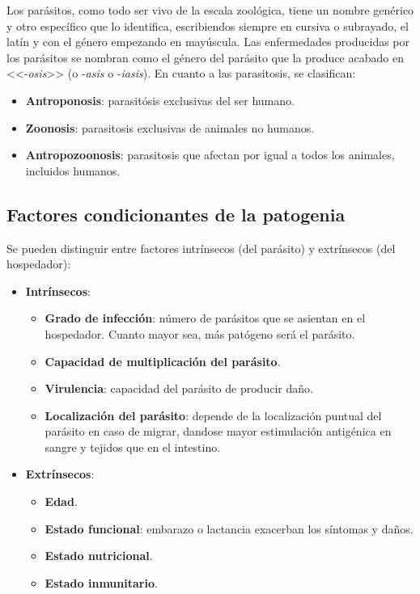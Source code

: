 Los parásitos, como todo ser vivo de la escala zoológica, tiene un nombre genérico y otro específico que lo identifica, escribiendos siempre en cursiva o subrayado, el latín y con el género empezando en mayúscula. Las enfermedades producidas por los parásitos se nombran como el género del parásito que la produce acabado en <<-\textit{osis}>> (o -\textit{asis} o -\textit{iasis}). En cuanto a las parasitosis, se clasifican:
\begin{itemize}[itemsep=0pt,parsep=0pt,topsep=0pt,partopsep=0pt]
	\item \textbf{Antroponosis}: parasitósis exclusivas del ser humano.
	\item\textbf{Zoonosis}: parasitosis exclusivas de animales no humanos.
	\item\textbf{Antropozoonosis}: parasitosis que afectan por igual a todos los animales, incluidos humanos.
\end{itemize}
\subsection{Factores condicionantes de la patogenia}
Se pueden distinguir entre factores intrínsecos (del parásito) y extrínsecos (del hospedador):
\begin{itemize}[itemsep=0pt,parsep=0pt,topsep=0pt,partopsep=0pt]
	\item \textbf{Intrínsecos}:
	\begin{itemize}[itemsep=0pt,parsep=0pt,topsep=0pt,partopsep=0pt]
		\item \textbf{Grado de infección}: número de parásitos que se asientan en el hospedador. Cuanto mayor sea, más patógeno será el parásito.
		\item\textbf{Capacidad de multiplicación del parásito}.
		\item\textbf{Virulencia}: capacidad del parásito de producir daño.
		\item\textbf{Localización del parásito}: depende de la localización puntual del parásito en caso de migrar, dandose mayor estimulación antigénica en sangre y tejidos que en el intestino.
	\end{itemize}
	\item\textbf{Extrínsecos}:
	\begin{itemize}[itemsep=0pt,parsep=0pt,topsep=0pt,partopsep=0pt]
		\item \textbf{Edad}.
		\item\textbf{Estado funcional}: embarazo o lactancia exacerban los síntomas y daños.
		\item\textbf{Estado nutricional}.
		\item\textbf{Estado inmunitario}.
	\end{itemize}
\end{itemize}

